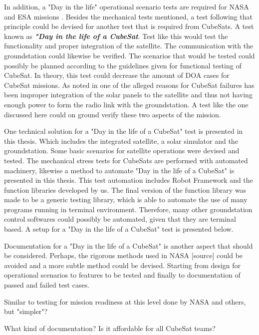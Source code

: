 \documentclass[english,12pt,a4paper,pdftex,elec,utf8]{aaltothesis}
\begin{document}
In addition, a "Day in the life" operational scenario tests are required for NASA and ESA missions \cite{tor}. Besides the mechanical tests mentioned, a test following that principle could be devised for another test that is required from CubeSats. A test known as \textbf{\textit{"Day in the life of a CubeSat}}. Test like this would test the functionality and proper integration of the satellite. The communication with the groundstation could likewise be verified. The scenarios that would be tested could possibly be planned according to the guidelines given for functional testing of CubeSat. In theory, this test could decrease the amount of DOA cases for CubeSat missions. As noted in \cite{Swart1, Langer} one of the alleged reasons for CubeSat failures has been improper integration of the solar panels to the satellite and thus not having enough power to form the radio link with the groundstation. A test like the one discussed here could on ground verify these two aspects of the mission.\par
One technical solution for a "Day in the life of a CubeSat" test is presented in this thesis. Which includes the integrated satellite, a solar simulator and the groundstation. Some basic scenarios for satellite operations were devised and tested. The mechanical stress tests for CubeSats are performed with automated machinery, likewise a method to automate "Day in the life of a CubeSat" is presented in this thesis. This test automation includes Robot Framework and the function libraries developed by us. The final version of the function library was made to be a generic testing library, which is able to automate the use of many programs running in terminal environment. Therefore, many other groundstation control softwares could possibly be automated, given that they are terminal based. A setup for a "Day in the life of a CubeSat" test is presented below.\par 
Documentation for a "Day in the life of a CubeSat" is another aspect that should be considered. Perhaps, the rigorous methods used in NASA [source] could be avoided and a more subtle method could be devised. Starting from design for operational scenarios to features to be tested and finally to documentation of passed and failed test cases.\par
  
Similar to testing for mission readiness at this level done by NASA and others, but "simpler"?\par 
What kind of documentation? Is it affordable for all CubeSat teams?\par
\end{document}
